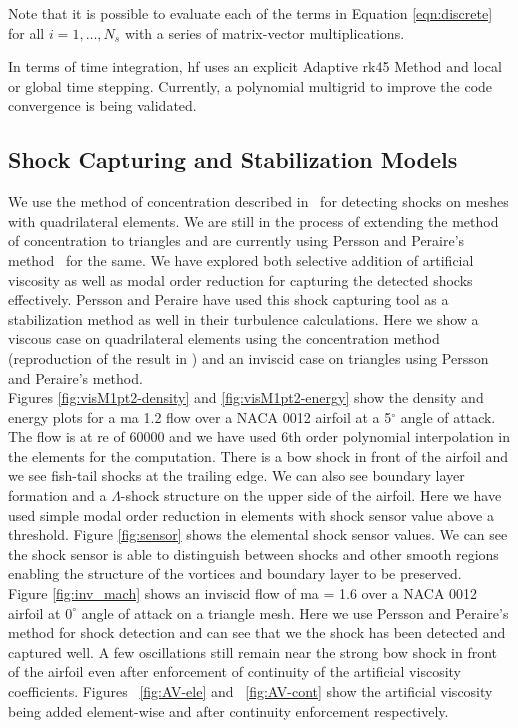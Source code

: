 Note that it is possible to evaluate each of the terms in Equation \eqref{eqn:discrete} for all $i = 1,\dots,N_s$ with a series of matrix-vector multiplications.

In terms of time integration, \gls{hf} uses an explicit Adaptive \gls{rk45} Method and local or global time stepping. Currently, a polynomial multigrid to improve the code convergence is being validated.

\subsection{Shock Capturing and Stabilization Models}

We use the method of concentration described in~\cite{Sheshadri2014} for detecting shocks on meshes with quadrilateral elements. We are still in the process of extending the method of concentration to triangles and are currently using Persson and Peraire's method~\cite{persson2006sub, Persson13} for the same. We have explored both selective addition of artificial viscosity as well as modal order reduction for capturing the detected shocks effectively. Persson and Peraire have used this shock capturing tool as a stabilization method as well in their turbulence calculations. Here we show a viscous case on quadrilateral elements using the concentration method (reproduction of the result in \cite{Sheshadri2014}) and an inviscid case on triangles using Persson and Peraire's method. \\

 Figures \ref{fig:visM1pt2-density} and \ref{fig:visM1pt2-energy} show the density and energy plots for a \gls{ma} 1.2 flow over a NACA 0012 airfoil at a 5$^{\circ}$ angle of attack. The flow is at \gls{re} of 60000 and we have used 6th order polynomial interpolation in the elements for the computation. There is a bow shock in front of the airfoil and we see fish-tail shocks at the trailing edge. We can also see boundary layer formation and a $\Lambda$-shock structure on the upper side of the airfoil. Here we have used simple modal order reduction in elements with shock sensor value above a threshold. Figure \ref{fig:sensor} shows the elemental shock sensor values. We can see the shock sensor is able to distinguish between shocks and other smooth regions enabling the structure of the vortices and boundary layer to be preserved. \\
 
 Figure \ref{fig:inv_mach} shows an inviscid flow of \gls{ma} = 1.6 over a NACA 0012 airfoil at $0^{\circ}$ angle of attack on a triangle mesh. Here we use Persson and Peraire's method  for shock detection and can see that we the shock has been detected and captured well. A few oscillations still remain near the strong bow shock in front of the airfoil even after enforcement of continuity of the artificial viscosity coefficients. Figures ~\ref{fig:AV-ele} and ~\ref{fig:AV-cont} show the artificial viscosity being added element-wise and after continuity enforcement respectively.

